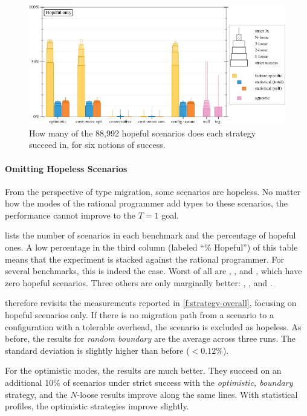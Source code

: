 \begin{figure}[ht]
  \includegraphics[width=\columnwidth]{data/strategy-overall-hopeful.pdf}
  \caption{How many of the 88,992 hopeful scenarios does each strategy succeed in, for six notions of success.}
  \label{f:strategy-hope}
\end{figure}

\paragraph{Omitting Hopeless Scenarios} From the perspective of type migration,
some scenarios are hopeless. No matter how the modes of the rational programmer
add types to these scenarios, the performance cannot improve to the $T=1$ goal.

 lists the number of scenarios in each benchmark and the
percentage of hopeful ones. A low percentage in the third column (labeled ``\%
Hopeful'') of this table means that the experiment is stacked against the rational
programmer.  For several benchmarks, this is indeed the case.  Worst of all are
, , and , which have zero hopeful
scenarios.  Three others are only marginally better: ,
, and .

 therefore revisits the measurements reported in
\cref{f:strategy-overall}, focusing on hopeful scenarios only.  If there is no
migration path from a scenario to a configuration with a tolerable overhead, the
scenario is excluded as hopeless.  As before, the results for \emph{random
boundary} are the average across three runs.  The standard deviation is slightly
higher than before ($<0.12\%$).

For the optimistic modes, the results are much better.  They succeed on an
additional 10\% of scenarios under strict success with the \emph{optimistic,
boundary} strategy, and the $N$-loose results improve along the same lines.
With statistical profiles, the optimistic strategies improve slightly.

